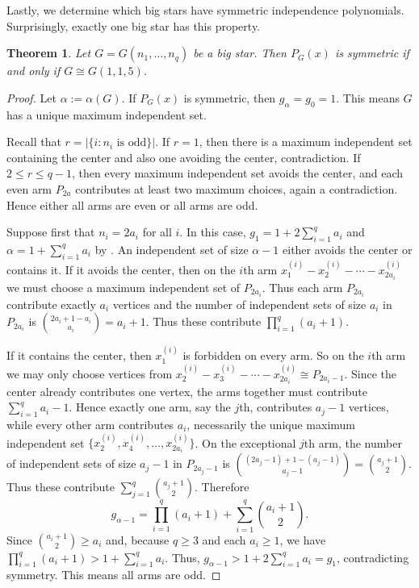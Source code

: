 \documentclass[12pt]{amsart}
\theoremstyle{plain}
\newtheorem{thm}{Theorem}[section]
\theoremstyle{definition}
\begin{document}
Lastly, we determine which big stars have symmetric independence polynomials. Surprisingly, exactly one big star has this property.

\begin{thm}\label{prop:big_star_symmetry}
Let \(G=G(n_1,\ldots,n_q)\) be a big star. Then \(P_G(x)\) is symmetric if and only if $G\cong G(1,1,5)$.
\end{thm}

\begin{proof}
Let $\alpha:=\alpha(G)$. If \(P_G(x)\) is symmetric, then \(g_{\alpha}=g_0=1\). This means \(G\) has a unique
maximum independent set.  


Recall that  \(r=|\{ i : n_i \text{ is odd} \}|\).  If \(r=1\), then there is a maximum independent set containing the center and also one
avoiding the center, contradiction. If \(2\le r\le q-1\), then every maximum independent
set avoids the center, and each even arm \(P_{2a}\) contributes at least two maximum
choices, again a contradiction. Hence either all arms are even or all arms are odd.

Suppose first that \(n_i=2a_i\) for all \(i\). In this case, $g_1=1+2\sum_{i=1}^q a_i$ and    $\alpha=1+\sum_{i=1}^q a_i$ by . An independent set of size \(\alpha-1\) either avoids the center or contains it. If it avoids the center, then on the \(i\)th arm $x^{(i)}_1-x^{(i)}_2-\cdots-x^{(i)}_{2a_i}$
we must choose a maximum independent set of \(P_{2a_i}\). Thus each arm $P_{2a_i}$ contribute exactly $a_i$ vertices and the number of independent sets of size $a_i$ in $P_{2a_i}$ is $\binom{2a_i+1-a_i}{a_i}=a_i+1$. Thus these contribute $\prod_{i=1}^q (a_i+1)$.

If it contains the center, then \(x^{(i)}_1\) is forbidden on every arm. So on the \(i\)th arm we may only choose vertices from $x^{(i)}_2-x^{(i)}_3-\cdots-x^{(i)}_{2a_i}\cong P_{2a_i-1}$.
Since the center already contributes one vertex, the arms together must contribute \(\sum_{i=1}^q a_i-1\). Hence exactly one arm, say the \(j\)th, contributes \(a_j-1\) vertices, while every other arm contributes \(a_i\), necessarily the unique maximum independent set $\{x^{(i)}_2,x^{(i)}_4,\ldots,x^{(i)}_{2a_i}\}$. 
On the exceptional \(j\)th arm, the number of independent sets of size \(a_j-1\) in \(P_{2a_j-1}\) is $\binom{(2a_j-1) +1- (a_j-1)}{a_j-1}= \binom{a_j+1}{2}$. 
Thus these contribute $\sum_{j=1}^q \binom{a_j+1}{2}$. Therefore
\[
g_{\alpha-1}
=
\prod_{i=1}^q (a_i+1)+\sum_{i=1}^q \binom{a_i+1}{2}.
\]
Since \(\binom{a_i+1}{2}\ge a_i\) and, because \(q\ge 3\) and each \(a_i\ge 1\), we have $\prod_{i=1}^q (a_i+1)>1+\sum_{i=1}^q a_i$.  Thus, $g_{\alpha-1}>1+2\sum_{i=1}^q a_i=g_1$,
contradicting symmetry. This means all arms are odd. 


\end{proof}
\end{document}
